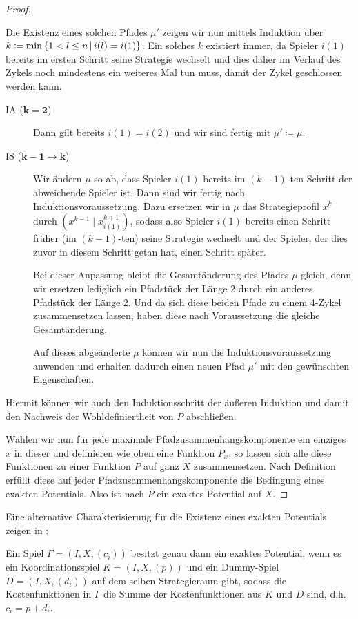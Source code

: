 \begin{proof}
\begin{description}
		Die Existenz eines solchen Pfades $\mu'$ zeigen wir nun mittels Induktion über $k \coloneqq \min\left\{1 < l \leq n \,\middle|\, i(l) = i(1)\right\}$. Ein solches $k$ existiert immer, da Spieler $i(1)$ bereits im ersten Schritt seine Strategie wechselt und dies daher im Verlauf des Zykels noch mindestens ein weiteres Mal tun muss, damit der Zykel geschlossen werden kann.
		\begin{description}
			\item[IA ($\bm{k=2}$)] Dann gilt bereits $i(1)=i(2)$ und wir sind fertig mit $\mu' \coloneqq \mu$.
			\item[IS ($\bm{k-1\to k}$)] Wir ändern $\mu$ so ab, dass Spieler $i(1)$ bereits im $(k-1)$-ten Schritt der abweichende Spieler ist. Dann sind wir fertig nach Induktionsvoraussetzung. Dazu ersetzen wir in $\mu$ das Strategieprofil $x^k$ durch $(x^{k-1} \mid x^{k+1}_{i(1)})$, sodass also Spieler $i(1)$ bereits einen Schritt früher (im $(k-1)$-ten) seine Strategie wechselt und der Spieler, der dies zuvor in diesem Schritt getan hat, einen Schritt später.
			
			Bei dieser Anpassung bleibt die Gesamtänderung des Pfades $\mu$ gleich, denn wir ersetzen lediglich ein Pfadstück der Länge $2$ durch ein anderes Pfadstück der Länge $2$. Und da sich diese beiden Pfade zu einem 4-Zykel zusammensetzen lassen, haben diese nach Voraussetzung die gleiche Gesamtänderung.
			
			Auf dieses abgeänderte $\mu$ können wir nun die Induktionsvoraussetzung anwenden und erhalten dadurch einen neuen Pfad $\mu'$ mit den gewünschten Eigenschaften.
		\end{description}
		Hiermit können wir auch den Induktionsschritt der äußeren Induktion und damit den Nachweis der Wohldefiniertheit von $P$ abschließen. 
	\end{description}	
	Wählen wir nun für jede maximale Pfadzusammenhangskomponente ein einziges $x$ in dieser und definieren wie oben eine Funktion $P_x$, so lassen sich alle diese Funktionen zu einer Funktion $P$ auf ganz $X$ zusammensetzen. Nach Definition erfüllt diese auf jeder Pfadzusammenhangskomponente die Bedingung eines exakten Potentials. Also ist nach  $P$ ein exaktes Potential auf $X$.
\end{proof}

Eine alternative Charakterisierung für die Existenz eines exakten Potentials zeigen \citeauthor{KoordDummy} in \cite[Theorem 2.1]{KoordDummy}:

\begin{satz}\label{satz:CharExPotAlt}
	Ein Spiel $\Gamma = (I, X, (c_i))$ besitzt genau dann ein exaktes Potential, wenn es ein Koordinationsspiel $K = (I, X, (p))$ und ein Dummy-Spiel $D = (I, X, (d_i))$ auf dem selben Strategieraum gibt, sodass die Kostenfunktionen in $\Gamma$ die Summe der Kostenfunktionen aus $K$ und $D$ sind, d.h. $c_i = p + d_i$.
\end{satz}


